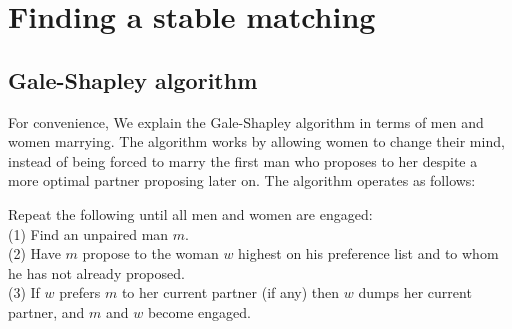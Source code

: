 \documentclass[11pt]{article}
\begin{document}
\section{Finding a stable matching}
\subsection{Gale-Shapley algorithm}
For convenience, We explain the Gale-Shapley algorithm in terms of men and
women marrying. The algorithm works by allowing women to change their mind,
instead of being forced to marry the first man who proposes to her despite a
more optimal partner proposing later on. The algorithm operates as follows:

\noindent
Repeat the following until all men and women are engaged:\\
(1) Find an unpaired man $m$.\\
(2) Have $m$ propose to the woman $w$ highest on his preference list and to
whom he has not already proposed.\\
(3) If $w$ prefers $m$ to her current partner (if any) then $w$ dumps her
current partner, and $m$ and $w$ become engaged.
\end{document}
